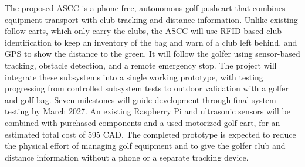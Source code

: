 \label{sec:conclusion}

The proposed \ac{ASCC} is a phone-free, autonomous golf pushcart that combines equipment transport with club tracking and distance information. Unlike existing follow carts, which only carry the clubs, the \ac{ASCC} will use RFID-based club identification to keep an inventory of the bag and warn of a club left behind, and \ac{GPS} to show the distance to the green. It will follow the golfer using sensor-based tracking, obstacle detection, and a remote emergency stop. The project will integrate these subsystems into a single working prototype, with testing progressing from controlled subsystem tests to outdoor validation with a golfer and golf bag. Seven milestones will guide development through final system testing by March 2027. An existing Raspberry Pi and ultrasonic sensors will be combined with purchased components and a used motorized golf cart, for an estimated total cost of 595 CAD. The completed prototype is expected to reduce the physical effort of managing golf equipment and to give the golfer club and distance information without a phone or a separate tracking device.
\label{ProposalBodyEnd}
\clearpage
